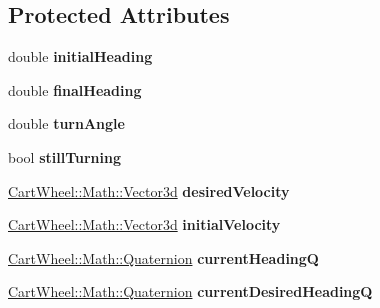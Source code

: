 \subsection*{Protected Attributes}
\begin{DoxyCompactItemize}
\item 
\hypertarget{classCartWheel_1_1Core_1_1TurnController_aa10908c0bfb9225952cddb83bed22dcd}{
double {\bfseries initialHeading}}
\label{classCartWheel_1_1Core_1_1TurnController_aa10908c0bfb9225952cddb83bed22dcd}

\item 
\hypertarget{classCartWheel_1_1Core_1_1TurnController_aa12514913535214b2f5d876aab877e25}{
double {\bfseries finalHeading}}
\label{classCartWheel_1_1Core_1_1TurnController_aa12514913535214b2f5d876aab877e25}

\item 
\hypertarget{classCartWheel_1_1Core_1_1TurnController_a57b10d2c37d7990decdc4298e06b611c}{
double {\bfseries turnAngle}}
\label{classCartWheel_1_1Core_1_1TurnController_a57b10d2c37d7990decdc4298e06b611c}

\item 
\hypertarget{classCartWheel_1_1Core_1_1TurnController_a9b0e3c3784d2f75561d5d162816a9f2e}{
bool {\bfseries stillTurning}}
\label{classCartWheel_1_1Core_1_1TurnController_a9b0e3c3784d2f75561d5d162816a9f2e}

\item 
\hypertarget{classCartWheel_1_1Core_1_1TurnController_ad44343bb5e15c8f04a6b5402bffe85a2}{
\hyperlink{classCartWheel_1_1Math_1_1Vector3d}{CartWheel::Math::Vector3d} {\bfseries desiredVelocity}}
\label{classCartWheel_1_1Core_1_1TurnController_ad44343bb5e15c8f04a6b5402bffe85a2}

\item 
\hypertarget{classCartWheel_1_1Core_1_1TurnController_a49a77fb2bfd0e5b9dc229715382dee3d}{
\hyperlink{classCartWheel_1_1Math_1_1Vector3d}{CartWheel::Math::Vector3d} {\bfseries initialVelocity}}
\label{classCartWheel_1_1Core_1_1TurnController_a49a77fb2bfd0e5b9dc229715382dee3d}

\item 
\hypertarget{classCartWheel_1_1Core_1_1TurnController_a89b5b5f05c8db24efc341e1b560bc1c5}{
\hyperlink{classCartWheel_1_1Math_1_1Quaternion}{CartWheel::Math::Quaternion} {\bfseries currentHeadingQ}}
\label{classCartWheel_1_1Core_1_1TurnController_a89b5b5f05c8db24efc341e1b560bc1c5}

\item 
\hypertarget{classCartWheel_1_1Core_1_1TurnController_a0689a9eeb4072efe54ffd6df1169511a}{
\hyperlink{classCartWheel_1_1Math_1_1Quaternion}{CartWheel::Math::Quaternion} {\bfseries currentDesiredHeadingQ}}
\label{classCartWheel_1_1Core_1_1TurnController_a0689a9eeb4072efe54ffd6df1169511a}


\end{DoxyCompactItemize}
